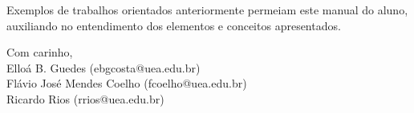 

Exemplos de trabalhos orientados anteriormente permeiam este manual do aluno, auxiliando no entendimento dos elementos e conceitos apresentados.

\begin{flushright}
Com carinho,\\
Elloá B. Guedes (ebgcosta@uea.edu.br)\\
Flávio José Mendes Coelho (fcoelho@uea.edu.br)\\
Ricardo Rios (rrios@uea.edu.br)
\end{flushright}
